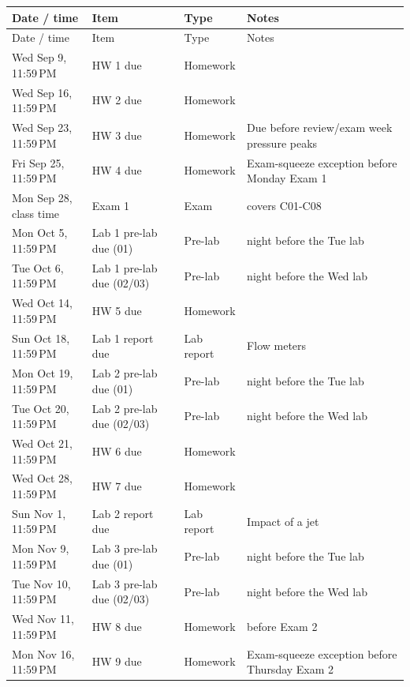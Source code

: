 \begin{longtable}{@{}L{0.190\textwidth} L{0.270\textwidth} L{0.110\textwidth} L{0.360\textwidth}@{}}
\toprule
Date / time & Item & Type & Notes \\
\midrule
\endfirsthead
\toprule
Date / time & Item & Type & Notes \\
\midrule
\endhead
\bottomrule
\endfoot
 Wed Sep 9, 11:59\,PM & HW 1 due & Homework & {\footnotesize } \\
 Wed Sep 16, 11:59\,PM & HW 2 due & Homework & {\footnotesize } \\
 Wed Sep 23, 11:59\,PM & HW 3 due & Homework & {\footnotesize Due before review/exam week pressure peaks} \\
 Fri Sep 25, 11:59\,PM & HW 4 due & Homework & {\footnotesize Exam-squeeze exception before Monday Exam 1} \\
 Mon Sep 28, class time & Exam 1 & Exam & {\footnotesize covers C01-C08} \\
 Mon Oct 5, 11:59\,PM & Lab 1 pre-lab due (01) & Pre-lab & {\footnotesize night before the Tue lab} \\
 Tue Oct 6, 11:59\,PM & Lab 1 pre-lab due (02/03) & Pre-lab & {\footnotesize night before the Wed lab} \\
 Wed Oct 14, 11:59\,PM & HW 5 due & Homework & {\footnotesize } \\
 Sun Oct 18, 11:59\,PM & Lab 1 report due & Lab report & {\footnotesize Flow meters} \\
 Mon Oct 19, 11:59\,PM & Lab 2 pre-lab due (01) & Pre-lab & {\footnotesize night before the Tue lab} \\
 Tue Oct 20, 11:59\,PM & Lab 2 pre-lab due (02/03) & Pre-lab & {\footnotesize night before the Wed lab} \\
 Wed Oct 21, 11:59\,PM & HW 6 due & Homework & {\footnotesize } \\
 Wed Oct 28, 11:59\,PM & HW 7 due & Homework & {\footnotesize } \\
 Sun Nov 1, 11:59\,PM & Lab 2 report due & Lab report & {\footnotesize Impact of a jet} \\
 Mon Nov 9, 11:59\,PM & Lab 3 pre-lab due (01) & Pre-lab & {\footnotesize night before the Tue lab} \\
 Tue Nov 10, 11:59\,PM & Lab 3 pre-lab due (02/03) & Pre-lab & {\footnotesize night before the Wed lab} \\
 Wed Nov 11, 11:59\,PM & HW 8 due & Homework & {\footnotesize before Exam 2} \\
 Mon Nov 16, 11:59\,PM & HW 9 due & Homework & {\footnotesize Exam-squeeze exception before Thursday Exam 2} \\

\end{longtable}
